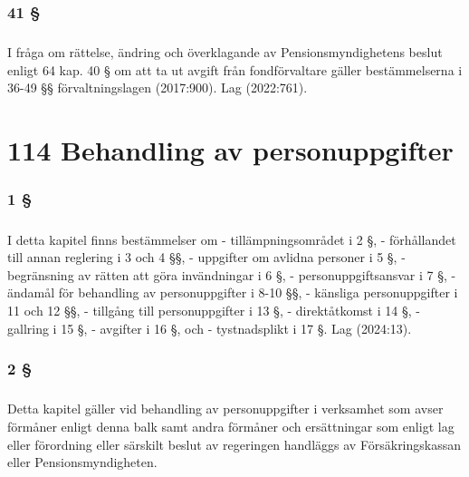\documentclass[a4paper,notitlepage,openany,10pt]{book}
\begin{document}
\subsection*{41 §}
\paragraph*{}
I fråga om rättelse, ändring och överklagande av Pensionsmyndighetens beslut enligt 64 kap. 40 § om att ta ut avgift från fondförvaltare gäller bestämmelserna i 36-49 §§ förvaltningslagen (2017:900).
Lag (2022:761).
\chapter*{114 Behandling av personuppgifter}
\subsection*{1 §}
\paragraph*{}
I detta kapitel finns bestämmelser om
\newline - tillämpningsområdet i 2 §,
\newline - förhållandet till annan reglering i 3 och 4 §§,
\newline - uppgifter om avlidna personer i 5 §,
\newline - begränsning av rätten att göra invändningar i 6 §,
\newline - personuppgiftsansvar i 7 §,
\newline - ändamål för behandling av personuppgifter i 8-10 §§,
\newline - känsliga personuppgifter i 11 och 12 §§,
\newline - tillgång till personuppgifter i 13 §,
\newline - direktåtkomst i 14 §,
\newline - gallring i 15 §,
\newline - avgifter i 16 §, och
\newline - tystnadsplikt i 17 §.
Lag (2024:13).
\subsection*{2 §}
\paragraph*{}
Detta kapitel gäller vid behandling av personuppgifter i verksamhet som avser förmåner enligt denna balk samt andra förmåner och ersättningar som enligt lag eller förordning eller särskilt beslut av regeringen handläggs av Försäkringskassan eller Pensionsmyndigheten.
\end{document}
